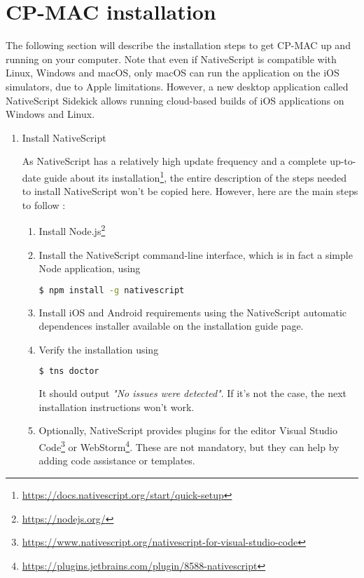 \section{CP-MAC installation}
The following section will describe the installation steps to get CP-MAC up and running on your computer. Note that even if NativeScript is compatible with Linux, Windows and macOS, only macOS can run the application on the iOS simulators, due to Apple limitations. However, a new desktop application called NativeScript Sidekick allows running cloud-based builds of iOS applications on Windows and Linux.

\begin{enumerate}
	\item Install NativeScript
	
	As NativeScript has a relatively high update frequency and a complete up-to-date guide about its installation\footnote{\url{https://docs.nativescript.org/start/quick-setup}}, the entire description of the steps needed to install NativeScript won't be copied here. However, here are the main steps to follow :
	\begin{enumerate}
		\item Install Node.js\footnote{\url{https://nodejs.org/}} 
		\item Install the NativeScript command-line interface, which is in fact a simple Node application, using
		\begin{lstlisting}[language=bash]
$ npm install -g nativescript
		\end{lstlisting}
		\item Install iOS and Android requirements using the NativeScript automatic dependences installer available on the installation guide page.
		\item Verify the installation using
		\begin{lstlisting}[language=bash]
$ tns doctor
		\end{lstlisting}
		It should output \textit{"No issues were detected"}. If it's not the case, the next installation instructions won't work.
		
		\item Optionally, NativeScript provides plugins for the editor Visual Studio Code\footnote{\url{https://www.nativescript.org/nativescript-for-visual-studio-code}} or WebStorm\footnote{\url{https://plugins.jetbrains.com/plugin/8588-nativescript}}. These are not mandatory, but they can help by adding code assistance or templates.
	\end{enumerate}


\end{enumerate}
